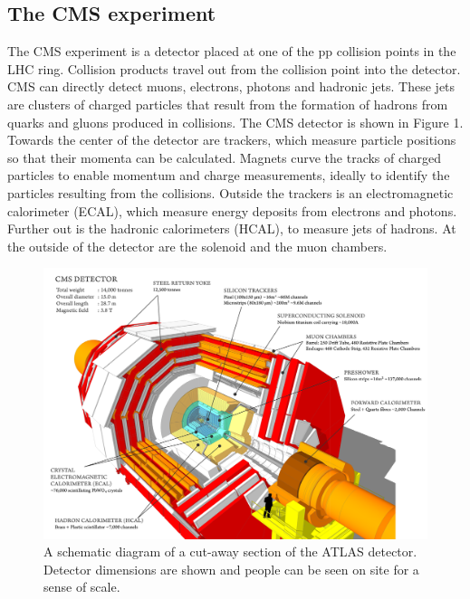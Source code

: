 \documentclass[letter]{article}
\newcommand\tab[1][1cm]{\hspace*{#1}}
\begin{document}
\subsection{The CMS experiment}
\tab The CMS experiment is a detector placed at one of the pp collision points in the LHC ring. Collision products travel out from the collision point into the detector. CMS can directly detect muons, electrons, photons and hadronic jets. These jets are clusters of charged particles that result from the formation of hadrons from quarks and gluons produced in collisions. The CMS detector is shown in Figure 1. Towards the center of the detector are trackers, which measure particle positions so that their momenta can be calculated. Magnets curve the tracks of charged particles to enable momentum and charge measurements, ideally to identify the particles resulting from the collisions. Outside the trackers is an electromagnetic calorimeter (ECAL), which measure energy deposits from electrons and photons. Further out is the hadronic calorimeters (HCAL), to measure jets of hadrons. At the outside of the detector are the solenoid and the muon chambers. 
\begin{figure}
    \centering
    \includegraphics[scale=0.1]{cms}
    \caption{A schematic diagram of a cut-away section of the ATLAS detector. Detector dimensions are shown and people can be seen on site for a sense of scale.}
    \label{fig:cms}
\end{figure}
\end{document}

